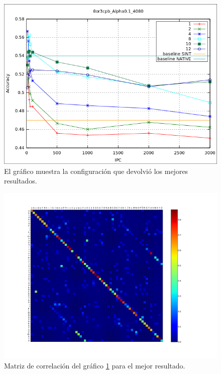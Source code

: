 			\begin{figure}[htbp]
				\centering
				\includegraphics[scale=0.6]{img/resultados/mixtas/best_expon_8or3cpb_Alpha0,1_4080.png}
				\caption[Mixtas expon mejor resultado]{El gráfico muestra la configuración que devolvió los mejores resultados.}
				\label{fig: Mixtas-expon-mejor}
			\end{figure}

			\begin{figure}[!htbp]
				\centerline{\includegraphics[scale=0.4]{img/resultados/mixtas/best_expon_matrix_Alpha0,1_4080-4.png}}
				\caption[Mixtas Matriz expon]{Matriz de correlación del gráfico \ref{fig: Mixtas-expon-mejor} para el mejor resultado. }
				\label{fig: Mixtas-Matrix-expon-mejor}
			\end{figure}
	
